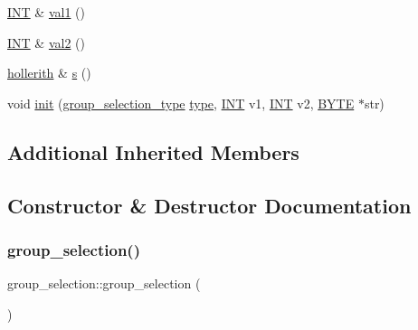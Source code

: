 \begin{DoxyCompactItemize}
\item 
\mbox{\hyperlink{galois_8h_a09fddde158a3a20bd2dcadb609de11dc}{I\+NT}} \& \mbox{\hyperlink{classgroup__selection_a9b9578c0fe171d6aef98a1cb6926c4ea}{val1}} ()
\item 
\mbox{\hyperlink{galois_8h_a09fddde158a3a20bd2dcadb609de11dc}{I\+NT}} \& \mbox{\hyperlink{classgroup__selection_a9354cad24b302f9faf3924cbb9f7947c}{val2}} ()
\item 
\mbox{\hyperlink{classhollerith}{hollerith}} \& \mbox{\hyperlink{classgroup__selection_a686cb0c6a3a040796b112b8007ea8223}{s}} ()
\item 
void \mbox{\hyperlink{classgroup__selection_ad12ab2226024716902e4a85c4772732b}{init}} (\mbox{\hyperlink{discreta_8h_a9fbd019a849defc14910ae0a667c516e}{group\+\_\+selection\+\_\+type}} \mbox{\hyperlink{classgroup__selection_a7d7efa588eae53bc12ab0cc6a45fad31}{type}}, \mbox{\hyperlink{galois_8h_a09fddde158a3a20bd2dcadb609de11dc}{I\+NT}} v1, \mbox{\hyperlink{galois_8h_a09fddde158a3a20bd2dcadb609de11dc}{I\+NT}} v2, \mbox{\hyperlink{galois_8h_ab6cc7b4aeb6ea31aba2b3fbfc83ff5e6}{B\+Y\+TE}} $\ast$str)
\end{DoxyCompactItemize}
\subsection*{Additional Inherited Members}


\subsection{Constructor \& Destructor Documentation}
\mbox{\label{classgroup__selection_a2becdd8a6d93195ff4faa1e0df6f9eae}} 
\subsubsection{\texorpdfstring{group\+\_\+selection()}{group\_selection()}\hspace{0.1cm}{\footnotesize\ttfamily [1/2]}}
{\footnotesize\ttfamily group\+\_\+selection\+::group\+\_\+selection (\begin{DoxyParamCaption}{ }\end{DoxyParamCaption})}

\mbox{\label{classgroup__selection_a8c1d31e033e97292bd58fd64b5353322}} 
